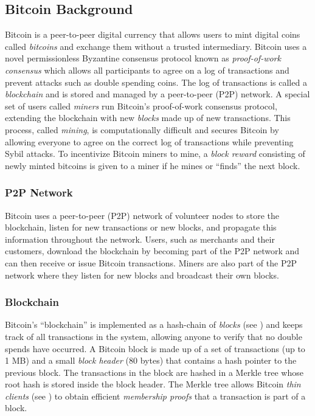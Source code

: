 \subsection{Bitcoin Background}
\label{sec:background:bitcoin}

Bitcoin\cite{bitcoin,sokbitcoin,princetonbitcoinbook,bitcoinandbeyond} is a peer-to-peer digital currency that allows users to mint digital coins called \emph{bitcoins} and exchange them without a trusted intermediary.
Bitcoin uses a novel permissionless Byzantine consensus protocol known as \emph{proof-of-work consensus}\cite{blockchainproto} which allows all participants to agree on a log of transactions and prevent attacks such as double spending coins.
The log of transactions is called a \emph{blockchain} and is stored and managed by a peer-to-peer (P2P) network\cite{bitcoin-p2p}.
A special set of users called \emph{miners} run Bitcoin's proof-of-work consensus protocol, extending the blockchain with new \emph{blocks} made up of new transactions.
This process, called \emph{mining}, is computationally difficult and secures Bitcoin by allowing everyone to agree on the correct log of transactions while preventing Sybil attacks\cite{sybil}.
To incentivize Bitcoin miners to mine, a \emph{block reward} consisting of newly minted bitcoins is given to a miner if he mines or ``finds'' the next block.

\subsubsection{P2P Network}
\label{sec:background:bitcoin:p2p}
Bitcoin uses a peer-to-peer (P2P) network of volunteer nodes to store the blockchain\cite{bitcoin-p2p}, listen for new transactions or new blocks, and propagate this information throughout the network.
Users, such as merchants and their customers, download the blockchain by becoming part of the P2P network and can then receive or issue Bitcoin transactions.
Miners are also part of the P2P network where they listen for new blocks and broadcast their own blocks.

\subsubsection{Blockchain}
\label{sec:background:bitcoin:blockchain}
Bitcoin's ``blockchain'' is implemented as a hash-chain of \emph{blocks} (see ) and keeps track of all transactions in the system, allowing anyone to verify that no double spends have occurred.
A Bitcoin block is made up of a set of transactions (up to 1 MB) and a small \emph{block header} (80 bytes) that contains a hash pointer to the previous block.
The transactions in the block are hashed in a Merkle tree\cite{merkle} whose root hash is stored inside the block header.
The Merkle tree allows Bitcoin \emph{thin clients} (see ) to obtain efficient \emph{membership proofs} that a transaction is part of a block.

